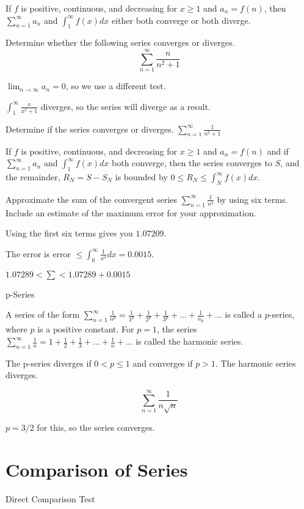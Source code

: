 \documentclass[../bccalc.tex]{subfiles}
\begin{document}
If $f$ is positive, continuous, and decreasing for $x\geq 1$ and  $a_n=f(n)$, then $\sum_{n=1}^{\infty}a_n$ and $\int_1^{\infty}f(x)dx$ either both converge or both diverge.

\begin{example}
    Determine whether the following series converges or diverges.
    \[ \sum_{n=1}^{\infty}\frac{n}{n^2+1} \]

    $\lim_{n\to\infty}a_n=0$, so we use a different test.

    $\int_1^{\infty} \frac{x}{x^2+1}$ diverges, so the series will diverge as a result.
\end{example}

\ex Determine if the series converges or diverges. $\sum_{n=1}^{\infty}\frac{1}{n^2+1}$

If $f$ is positive, continuous, and decreasing for $x\geq 1$ and $a_n=f(n)$ and if $\sum_{n=1}^{\infty} a_n$ and $\int_1^{\infty}f(x)dx$ both converge, then the series converges to $S$, and the remainder, $R_N=S-S_N$ is bounded by $0\leq R_N\leq \int_N^{\infty}f(x)dx$.

\begin{example}
    Approximate the sum of the convergent series $\sum_{n=1}^{\infty}\frac{1}{n^4}$ by using six terms. Include an estimate of the maximum error for your approximation.

    Using the first six terms gives you $1.07209$.

    The error is error $\leq \int_6^{\infty}\frac{1}{x^4}dx=0.0015$.

    $1.07289<\sum < 1.07289+0.0015$
\end{example}

p-Series 

A series of the form $\sum_{n=1}^{\infty} \frac{1}{n^p}=\frac{1}{1^p}+\frac{1}{2^p}+\frac{1}{3^p}+\dots+\frac{1}{n_p}+\dots$ is called a $p$-series, where $p$ is a positive constant. For $p=1$, the series $\sum_{n=1}^{\infty}\frac{1}{n}=1+\frac{1}{2}+\frac{1}{3}+\dots+\frac{1}{n}+\dots$ is called the harmonic series.

The p-series diverges if $0<p\leq 1$ and converges if $p>1$. The harmonic series diverges.

\begin{example}
    \[ \sum_{n=1}^{\infty}\frac{1}{n\sqrt{n}}\]

    $p=3/2$ for this, so the series converges.
\end{example}

\section{Comparison of Series}
Direct Comparison Test 
\end{document}
